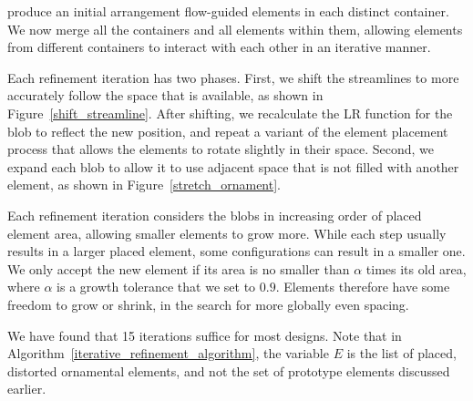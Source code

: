 
\newtext
{
 produce an initial arrangement  
flow-guided elements in each distinct container.
We now merge all the containers and all elements within them,
allowing elements from different containers to interact with each other 
in an iterative manner.
}


Each refinement iteration has two phases.
First, we shift the streamlines to more accurately follow the space that is available,
as shown in Figure~\ref{shift_streamline}. After shifting, we recalculate the LR function
for the blob to reflect the new position, and repeat a variant of the
element placement process
that allows the elements to rotate slightly in their space.
Second, we expand each blob to allow it to use adjacent space that is not 
filled with another element, as shown in Figure~\ref{stretch_ornament}.

Each refinement iteration considers the blobs in increasing order of 
placed element area, allowing smaller elements to grow more.   While each step
usually results in a larger placed element, some
configurations can result in a smaller one. We only accept the new element if its
area is no smaller than $\alpha$ times its old area, where $\alpha$ is a growth tolerance
that we set to $0.9$. Elements therefore have some freedom to grow or
shrink, in the search for more globally even spacing.

We have found that 15 iterations suffice for most designs.
Note that in Algorithm~\ref{iterative_refinement_algorithm}, the variable
$E$ is the list of placed, distorted ornamental elements, and
not the set of prototype elements discussed earlier.

